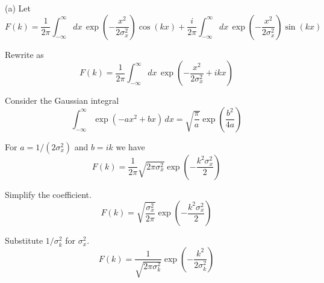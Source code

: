 


(a) Let
\begin{equation*}
F(k)
=\frac{1}{2\pi}\int_{-\infty}^\infty dx\,
\exp\left(-\frac{x^2}{2\sigma_x^2}\right)\cos(kx)
+\frac{i}{2\pi}\int_{-\infty}^\infty dx\,
\exp\left(-\frac{x^2}{2\sigma_x^2}\right)\sin(kx)
\tag{1}
\end{equation*}

Rewrite as
\begin{equation*}
F(k)=\frac{1}{2\pi}\int_{-\infty}^\infty dx\,
\exp\left(-\frac{x^2}{2\sigma_x^2}+ikx\right)
\end{equation*}

Consider the Gaussian integral
\begin{equation*}
\int_{-\infty}^\infty\exp(-ax^2+bx)\,dx=\sqrt{\frac{\pi}{a}}\exp\left(\frac{b^2}{4a}\right)
\end{equation*}

For $a=1/(2\sigma_x^2)$ and $b=ik$ we have
\begin{equation*}
F(k)=\frac{1}{2\pi}\sqrt{2\pi\sigma_x^2}\exp\left(-\frac{k^2\sigma_x^2}{2}\right)
\end{equation*}

Simplify the coefficient.
\begin{equation*}
F(k)=\sqrt{\frac{\sigma_x^2}{2\pi}}\exp\left(-\frac{k^2\sigma_x^2}{2}\right)
\end{equation*}

Substitute $1/\sigma_k^2$ for $\sigma_x^2$.
\begin{equation*}
F(k)=\frac{1}{\sqrt{2\pi\sigma_k^2}}\exp\left(-\frac{k^2}{2\sigma_k^2}\right)
\tag{2}
\end{equation*}

